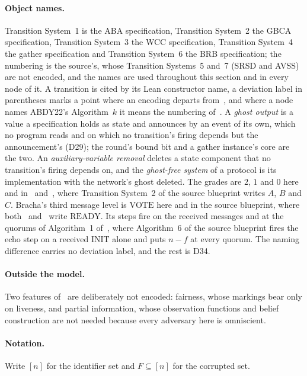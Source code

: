 \paragraph{Object names.}
Transition System~1 is the ABA specification, Transition System~2 the GBCA specification, Transition System~3 the WCC specification, Transition System~4 the gather specification and Transition System~6 the BRB specification; the numbering is the source's, whose Transition Systems~5 and~7 (SRSD and AVSS) are not encoded, and the names are used throughout this section and in every node of it.
A transition is cited by its Lean constructor name, a deviation label in parentheses marks a point where an encoding departs from~\cite{LeslieBP}, and where a node names ABDY22's Algorithm~$k$ it means the numbering of~\cite{ABDY22}.
A \emph{ghost output} is a value a specification holds as state and announces by an event of its own, which no program reads and on which no transition's firing depends but the announcement's (D29); the round's bound bit and a gather instance's core are the two.
An \emph{auxiliary-variable removal} deletes a state component that no transition's firing depends on, and the \emph{ghost-free system} of a protocol is its implementation with the network's ghost deleted.
The grades are $2$, $1$ and $0$ here and in~\cite{ABDY22} and~\cite{AFW25}, where Transition System~2 of the source blueprint writes $A$, $B$ and $C$.
Bracha's third message level is $\mathrm{VOTE}$ here and in the source blueprint, where both~\cite{ABDY22} and~\cite{AFW25} write $\mathrm{READY}$.
Its steps fire on the received messages and at the quorums of Algorithm~1 of~\cite{AFW25}, where Algorithm~6 of the source blueprint fires the echo step on a received $\mathrm{INIT}$ alone and puts $n-f$ at every quorum.
The naming difference carries no deviation label, and the rest is D34.

\paragraph{Outside the model.}
Two features of~\cite{LeslieBP} are deliberately not encoded: fairness, whose markings bear only on liveness, and partial information, whose observation functions and belief construction are not needed because every adversary here is omniscient.

\paragraph{Notation.}
Write $[n]$ for the identifier set and $F \subseteq [n]$ for the corrupted set.

